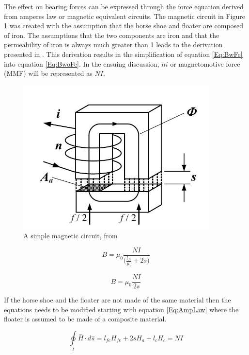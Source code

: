 The effect on bearing forces can be expressed through the force equation derived from amperes law or magnetic equivalent circuits. The magnetic circuit in Figure \ref{fig:SimpleMagneticCircuit} was created with the assumption that the horse shoe and floater are composed of iron. The assumptions that the two components are iron and that the permeability of iron is always much greater than 1 leads to the derivation presented in \cite{Wimer}. This derivation results in the simplification of equation \ref{Eq:BwFe} into equation \ref{Eq:BwoFe}. In the ensuing discussion, $ni$ or magnetomotive force (MMF) will be represented as $NI$.

\begin{figure}[!t]
	\centering
	\includegraphics[width=4in]{./Pictures/SimpleMagneticCircuit.jpg}
	\caption{A simple magnetic circuit, from \cite{MagBear}}
	\label{fig:SimpleMagneticCircuit}
\end{figure}

\begin{equation}\label{Eq:BwFe}
B={\mu }_{0}\frac{NI}{\Big(\frac{l_{fe}}{{\mu }_{r}}+2s\Big)}
\end{equation}

\begin{equation}\label{Eq:BwoFe}
B={\mu }_{0}\frac{NI}{2s}
\end{equation}

If the horse shoe and the floater are not made of the same material then the equations needs to be modified starting with equation \ref{Eq:AmpLaw} where the floater is assumed to be made of a composite material. 

\begin{equation}\label{Eq:AmpLaw}
\underset{l}{\oint }\stackrel{-}{H}\cdot d\stackrel{-}{s}={l}_{fe}{H}_{fe}+2s{H}_{a}+{l}_{c}{H}_{c}=NI
\end{equation}

